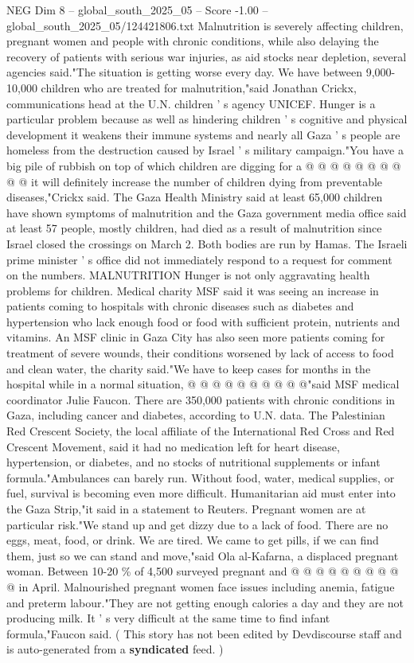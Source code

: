 \begin{textsample}{NEG Dim 8 – global\_south\_2025\_05 – Score -1.00 – global\_south\_2025\_05/124421806.txt}
Malnutrition is severely affecting children, pregnant women and people with chronic conditions, while also delaying the recovery of patients with serious war injuries, as aid stocks near depletion, several agencies said."The situation is getting worse every day.
We have between 9,000-10,000 children who are treated for malnutrition,"said Jonathan Crickx, communications head at the U.N. children ' s agency UNICEF.
Hunger is a particular problem because as well as hindering children ' s cognitive and physical development it weakens their immune systems and nearly all Gaza ' s people are homeless from the destruction caused by Israel ' s military campaign."You have a big pile of rubbish on top of which children are digging for a @ @ @ @ @ @ @ @ @ @ it will definitely increase the number of children dying from preventable diseases,"Crickx said.
The Gaza Health Ministry said at least 65,000 children have shown symptoms of malnutrition and the Gaza government media office said at least 57 people, mostly children, had died as a result of malnutrition since Israel closed the crossings on March 2.
Both bodies are run by Hamas.
The Israeli prime minister ' s office did not immediately respond to a request for comment on the numbers.
MALNUTRITION Hunger is not only aggravating health problems for children.
Medical charity MSF said it was seeing an increase in patients coming to hospitals with chronic diseases such as diabetes and hypertension who lack enough food or food with sufficient protein, nutrients and vitamins.
An MSF clinic in Gaza City has also seen more patients coming for treatment of severe wounds, their conditions worsened by lack of access to food and clean water, the charity said."We have to keep cases for months in the hospital while in a normal situation, @ @ @ @ @ @ @ @ @ @"said MSF medical coordinator Julie Faucon.
There are 350,000 patients with chronic conditions in Gaza, including cancer and diabetes, according to U.N. data.
The Palestinian Red Crescent Society, the local affiliate of the International Red Cross and Red Crescent Movement, said it had no medication left for heart disease, hypertension, or diabetes, and no stocks of nutritional supplements or infant formula."Ambulances can barely run.
Without food, water, medical supplies, or fuel, survival is becoming even more difficult.
Humanitarian aid must enter into the Gaza Strip,"it said in a statement to Reuters.
Pregnant women are at particular risk."We stand up and get dizzy due to a lack of food.
There are no eggs, meat, food, or drink.
We are tired.
We came to get pills, if we can find them, just so we can stand and move,"said Ola al-Kafarna, a displaced pregnant woman.
Between 10-20 \% of 4,500 surveyed pregnant and @ @ @ @ @ @ @ @ @ @ in April.
Malnourished pregnant women face issues including anemia, fatigue and preterm labour."They are not getting enough calories a day and they are not producing milk.
It ' s very difficult at the same time to find infant formula,"Faucon said. ( This story has not been edited by Devdiscourse staff and is auto-generated from a \textbf{syndicated} feed. )

\end{textsample}
